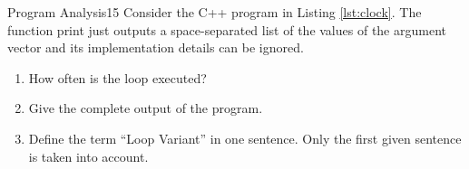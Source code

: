 \documentclass[a4paper,twoside]{article}
\begin{document}
%
%
%
\clearpage
\begin{task}{Program Analysis}{15}{}
  Consider the C++ program in Listing \ref{lst:clock}. The function print just outputs a space-separated list of the values of
  the argument vector and its implementation details can be ignored. 
  

  \begin{enumerate}
  \item{How often is the loop  executed?\vspace{2cm}}\clearpage
  \item{Give the complete output of the program.\vspace{12cm}}
  \item{Define the term ``Loop Variant'' in one sentence. Only the first given sentence is taken into account. \vspace{3cm}}
    \end{enumerate}
\end{task} %
\clearpage
\end{document}
